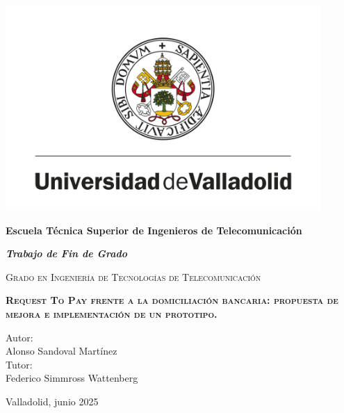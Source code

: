 \documentclass{article}
\begin{document}

\begin{titlepage}
    \centering
    {\includegraphics[width=0.9\textwidth]{Imagenes/Universidad-de-Valladolid.png}}\par
    {\bfseries\Large Escuela Técnica Superior de Ingenieros de Telecomunicación\par}
    \vspace{0.5cm}
    {\bfseries\itshape\Large Trabajo de Fin de Grado \par}
    \vspace{0.5cm}
    {\scshape Grado en Ingeniería de Tecnologías de Telecomunicación \par}
    \vspace{0.5cm}
    {\bfseries\scshape\Large Request To Pay frente a la domiciliación bancaria: propuesta de mejora e implementación de un prototipo. \par}
    \vspace{1.5cm}
    { Autor: \\}
    { Alonso Sandoval Martínez }\\
    \vspace{0.5cm}
    { Tutor:\\}
    { Federico Simmross Wattenberg }\\
    \vspace{1.5cm} {Valladolid, junio 2025 \par}
\end{titlepage}


\newpage
\tableofcontents
\end{document}
